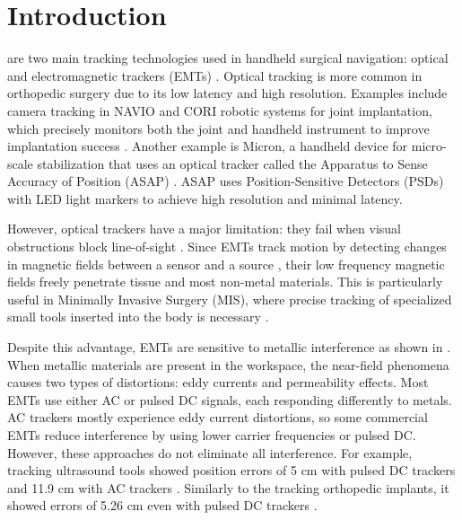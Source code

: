 \documentclass[journal,twoside,web]{ieeecolor}
\begin{document}
\section{Introduction}
 are two main tracking technologies used in handheld surgical navigation: optical and electromagnetic trackers (EMTs) \cite{sorriento_optical_2020}. Optical tracking is more common in orthopedic surgery due to its low latency and high resolution. Examples include camera tracking in NAVIO and CORI robotic systems for joint implantation, which precisely monitors both the joint and handheld instrument to improve implantation success \cite{adamska_robotic-assisted_2023}. Another example is Micron, a handheld device for micro-scale stabilization that uses an optical tracker called the Apparatus to Sense Accuracy of Position (ASAP) \cite{maclachlan_high-speed_2009,maclachlan_micron_2012}. ASAP uses Position-Sensitive Detectors (PSDs) with LED light markers to achieve high resolution and minimal latency.

However, optical trackers have a major limitation: they fail when visual obstructions block line-of-sight \cite{sorriento_optical_2020}. Since EMTs track motion by detecting changes in magnetic fields between a sensor and a source \cite{raab_magnetic_1979}, their low frequency magnetic fields freely penetrate tissue and most non-metal materials. This is particularly useful in Minimally Invasive Surgery (MIS), where precise tracking of specialized small tools inserted into the body is necessary \cite{chmarra_systems_2007}.

Despite this advantage, EMTs are sensitive to metallic interference as shown in \cite{sorriento_optical_2020, nixon_effects_1998}. When metallic materials are present in the workspace, the near-field phenomena causes two types of distortions: eddy currents and permeability effects. Most EMTs use either AC or pulsed DC signals, each responding differently to metals. AC trackers mostly experience eddy current distortions, so some commercial EMTs reduce interference by using lower carrier frequencies or pulsed DC. However, these approaches do not eliminate all interference. For example, tracking ultrasound tools showed position errors of 5 cm with pulsed DC trackers and 11.9 cm with AC trackers \cite{hastenteufel_effect_2006}. Similarly to the tracking orthopedic implants, it showed errors of 5.26 cm even with pulsed DC trackers \cite{milne_accuracy_1996}.
\end{document}
